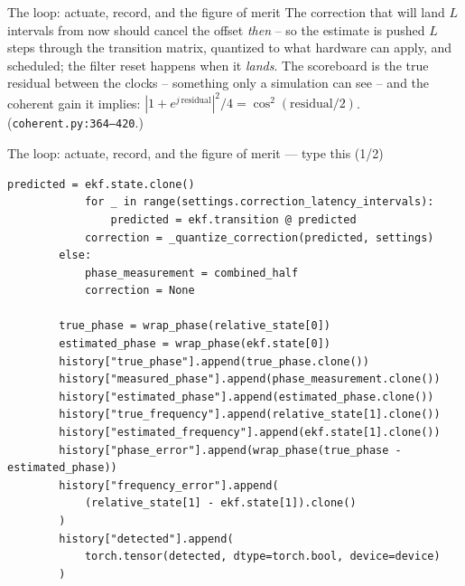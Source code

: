 \documentclass[10pt]{beamer}
\begin{document}
\begin{frame}{The loop: actuate, record, and the figure of merit}
  The correction that will land $L$ intervals from now should
  cancel the offset \emph{then} -- so the estimate is pushed
  $L$ steps through the transition matrix, quantized to what
  hardware can apply, and scheduled; the filter reset happens
  when it \emph{lands}. The scoreboard is the true residual
  between the clocks -- something only a simulation can see --
  and the coherent gain it implies:
  $|1+e^{j\,\text{residual}}|^2/4 = \cos^2(\text{residual}/2)$.
  (\texttt{coherent.py:364--420}.)
\end{frame}

\begin{frame}[fragile]{The loop: actuate, record, and the figure of merit --- type this (1/2)}
\begin{lstlisting}[basicstyle=\ttfamily\tiny]
            predicted = ekf.state.clone()
            for _ in range(settings.correction_latency_intervals):
                predicted = ekf.transition @ predicted
            correction = _quantize_correction(predicted, settings)
        else:
            phase_measurement = combined_half
            correction = None

        true_phase = wrap_phase(relative_state[0])
        estimated_phase = wrap_phase(ekf.state[0])
        history["true_phase"].append(true_phase.clone())
        history["measured_phase"].append(phase_measurement.clone())
        history["estimated_phase"].append(estimated_phase.clone())
        history["true_frequency"].append(relative_state[1].clone())
        history["estimated_frequency"].append(ekf.state[1].clone())
        history["phase_error"].append(wrap_phase(true_phase - estimated_phase))
        history["frequency_error"].append(
            (relative_state[1] - ekf.state[1]).clone()
        )
        history["detected"].append(
            torch.tensor(detected, dtype=torch.bool, device=device)
        )
\end{lstlisting}
\end{frame}
\end{document}
